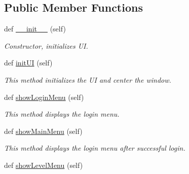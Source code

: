 \subsection*{Public Member Functions}
\begin{DoxyCompactItemize}
\item 
\hypertarget{classsrc_1_1game_1_1_game_a15684812af57df03feb870c9b4b380a2}{}def \hyperlink{classsrc_1_1game_1_1_game_a15684812af57df03feb870c9b4b380a2}{\+\_\+\+\_\+init\+\_\+\+\_\+} (self)\label{classsrc_1_1game_1_1_game_a15684812af57df03feb870c9b4b380a2}

\begin{DoxyCompactList}\small\item\em Constructor, initializes U\+I. \end{DoxyCompactList}\item 
\hypertarget{classsrc_1_1game_1_1_game_a89ba31b71efebcc9b2f43227d833e38f}{}def \hyperlink{classsrc_1_1game_1_1_game_a89ba31b71efebcc9b2f43227d833e38f}{init\+U\+I} (self)\label{classsrc_1_1game_1_1_game_a89ba31b71efebcc9b2f43227d833e38f}

\begin{DoxyCompactList}\small\item\em This method initializes the U\+I and center the window. \end{DoxyCompactList}\item 
\hypertarget{classsrc_1_1game_1_1_game_a7a14788a82ebc0d4b4b821ac1489a7a0}{}def \hyperlink{classsrc_1_1game_1_1_game_a7a14788a82ebc0d4b4b821ac1489a7a0}{show\+Login\+Menu} (self)\label{classsrc_1_1game_1_1_game_a7a14788a82ebc0d4b4b821ac1489a7a0}

\begin{DoxyCompactList}\small\item\em This method displays the login menu. \end{DoxyCompactList}\item 
\hypertarget{classsrc_1_1game_1_1_game_a218f9c8c6e86a19fa9d3155ce43068a0}{}def \hyperlink{classsrc_1_1game_1_1_game_a218f9c8c6e86a19fa9d3155ce43068a0}{show\+Main\+Menu} (self)\label{classsrc_1_1game_1_1_game_a218f9c8c6e86a19fa9d3155ce43068a0}

\begin{DoxyCompactList}\small\item\em This method displays the login menu after successful login. \end{DoxyCompactList}\item 
\hypertarget{classsrc_1_1game_1_1_game_afe69a6fa066d92365c226aff1c903e90}{}def \hyperlink{classsrc_1_1game_1_1_game_afe69a6fa066d92365c226aff1c903e90}{show\+Level\+Menu} (self)\label{classsrc_1_1game_1_1_game_afe69a6fa066d92365c226aff1c903e90}


\end{DoxyCompactItemize}
